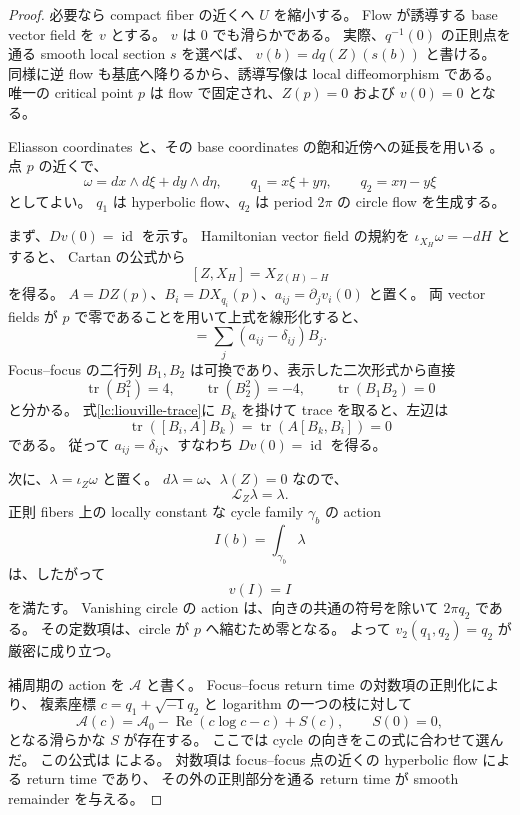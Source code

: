 \begin{proof}
必要なら compact fiber の近くへ $U$ を縮小する。
Flow が誘導する base vector field を $v$ とする。
$v$ は $0$ でも滑らかである。
実際、$q^{-1}(0)$ の正則点を通る smooth local section $s$ を選べば、
$v(b)=dq(Z)(s(b))$ と書ける。
同様に逆 flow も基底へ降りるから、誘導写像は local diffeomorphism である。
唯一の critical point $p$ は flow で固定され、$Z(p)=0$ および $v(0)=0$ となる。

Eliasson coordinates と、その base coordinates の飽和近傍への延長を用いる
\cite{vungoc-local,vw-local}。
点 $p$ の近くで、
\[
 \omega=dx\wedge d\xi+dy\wedge d\eta,
 \qquad q_1=x\xi+y\eta,
 \qquad q_2=x\eta-y\xi
\]
としてよい。
$q_1$ は hyperbolic flow、$q_2$ は period $2\pi$ の circle flow を生成する。

まず、$Dv(0)=\operatorname{id}$ を示す。
Hamiltonian vector field の規約を $\iota_{X_H}\omega=-dH$ とすると、
Cartan の公式から
\[
 [Z,X_H]=X_{Z(H)-H}
\]
を得る。
$A=DZ(p)$、$B_i=DX_{q_i}(p)$、$a_{ij}=\partial_jv_i(0)$ と置く。
両 vector fields が $p$ で零であることを用いて上式を線形化すると、
\begin{equation}
 [B_i,A]=\sum_j(a_{ij}-\delta_{ij})B_j.
 \label{lc:liouville-trace}
\end{equation}
Focus--focus の二行列 $B_1,B_2$ は可換であり、表示した二次形式から直接
\[
 \operatorname{tr}(B_1^2)=4,
 \qquad \operatorname{tr}(B_2^2)=-4,
 \qquad \operatorname{tr}(B_1B_2)=0
\]
と分かる。
式\eqref{lc:liouville-trace}に $B_k$ を掛けて trace を取ると、左辺は
\[
 \operatorname{tr}([B_i,A]B_k)
 =\operatorname{tr}(A[B_k,B_i])=0
\]
である。
従って $a_{ij}=\delta_{ij}$、すなわち $Dv(0)=\operatorname{id}$ を得る。

次に、$\lambda=\iota_Z\omega$ と置く。
$d\lambda=\omega$、$\lambda(Z)=0$ なので、
\[
 \mathcal L_Z\lambda=\lambda.
\]
正則 fibers 上の locally constant な cycle family $\gamma_b$ の action
\[
 I(b)=\int_{\gamma_b}\lambda
\]
は、したがって
\begin{equation}
 v(I)=I
 \label{lc:liouville-action}
\end{equation}
を満たす。
Vanishing circle の action は、向きの共通の符号を除いて $2\pi q_2$ である。
その定数項は、circle が $p$ へ縮むため零となる。
よって $v_2(q_1,q_2)=q_2$ が厳密に成り立つ。

補周期の action を $\mathcal A$ と書く。
Focus--focus return time の対数項の正則化により、
複素座標 $c=q_1+\sqrt{-1}q_2$ と logarithm の一つの枝に対して
\begin{equation}
 \mathcal A(c)=\mathcal A_0-\operatorname{Re}(c\log c-c)+S(c),
 \qquad S(0)=0,
 \label{lc:liouville-log-action}
\end{equation}
となる滑らかな $S$ が存在する。
ここでは cycle の向きをこの式に合わせて選んだ。
この公式は \cite[Proposition 3.1, Remark 3.2]{vungoc-local} による。
対数項は focus--focus 点の近くの hyperbolic flow による return time であり、
その外の正則部分を通る return time が smooth remainder を与える。


\end{proof}
